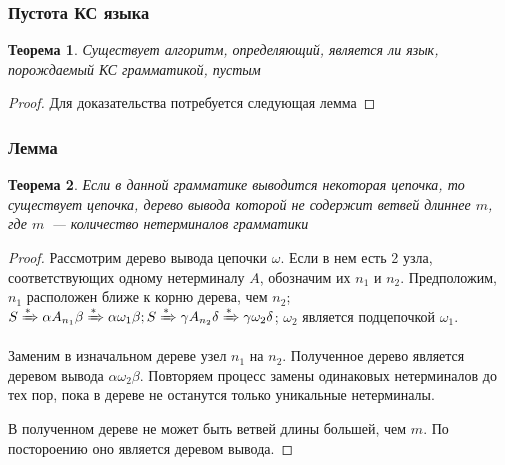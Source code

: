 \documentclass{beamer}
\newtheorem{rutheorem}{Теорема}
\newcommand{\derives}[1][*]{\xRightarrow[]{#1}}
\begin{document}
\begin{frame}[fragile]
  \transwipe[direction=90]
  \frametitle{Пустота КС языка}
   \begin{rutheorem}
   Существует алгоритм, определяющий, является ли язык, порождаемый КС грамматикой, пустым
   \end{rutheorem}
   \begin{proof}
     Для доказательства потребуется следующая лемма
   \end{proof}
\end{frame}




\begin{frame}[fragile]
  \transwipe[direction=90]
  \frametitle{Лемма}
   \begin{rutheorem}
   Если в данной грамматике выводится некоторая цепочка, то существует цепочка, дерево вывода которой не содержит ветвей длиннее $m$, где $m$~--- количество нетерминалов грамматики
   \end{rutheorem}

   \begin{proof}
   Рассмотрим дерево вывода цепочки $\omega$. Если в нем есть 2 узла, соответствующих одному нетерминалу $A$, обозначим их $n_1$ и $n_2$. Предположим, $n_1$ расположен ближе к корню дерева, чем $n_2$; $S \derives \alpha A_{n_1} \beta \derives \alpha \omega_1 \beta; S \derives \gamma A_{n_2} \delta \derives \gamma \omega_2 \delta$; $\omega_2$ является подцепочкой $\omega_1$.

   Заменим в изначальном дереве узел $n_1$ на $n_2$. Полученное дерево является деревом вывода $\alpha \omega_2 \beta$. Повторяем процесс замены одинаковых нетерминалов до тех пор, пока в дереве не останутся только уникальные нетерминалы.

   В полученном дереве не может быть ветвей длины большей, чем $m$. По постороению оно является деревом вывода.
   \end{proof}
\end{frame}
\end{document}
